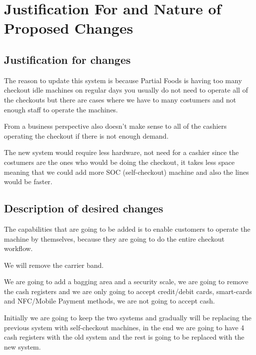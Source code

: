 \section{Justification For and  Nature of Proposed \newline Changes}

\subsection{Justification for changes}

The reason to update this system is because Partial Foods is having too 
many checkout idle machines on regular days you usually do not
need to operate all of the checkouts but there are cases where we have to
many costumers and not enough staff to operate the machines. 
\newline

\noindent
From a business perspective also doesn’t make sense to all of the cashiers 
operating the checkout if there is not enough demand. 
\newline

\noindent
The new system would require less hardware, not need for a cashier since the 
costumers are the ones who would be doing the checkout, it takes less space 
meaning that we could add more SOC (self-checkout) machine and also the lines 
would be faster. 
\newline

\subsection{Description of desired changes}

The capabilities that are going to be added is to enable customers to operate 
the machine by themselves, because they are going to do the entire 
checkout workflow.  
\newline

\noindent
We will remove the carrier band. 
\newline

\noindent
We are going to add a bagging area and a security scale, we are going to 
remove the cash registers and we are only going to accept credit/debit cards, 
smart-cards and NFC/Mobile Payment methods, we are not 
going to accept cash.  
\newline

\noindent
Initially we are going to keep the two systems and gradually will be replacing 
the previous system with self-checkout machines, in the end we are going to 
have 4 cash registers with the old system and the rest is going to be replaced 
with the new system.  
\newline


